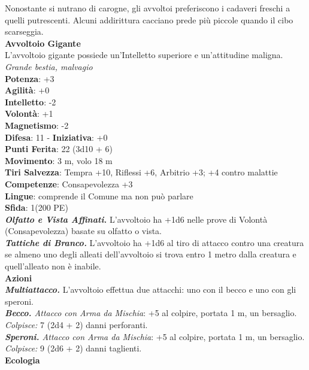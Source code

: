 \begin{multicols}{2}
Nonostante si nutrano di carogne, gli avvoltoi preferiscono i cadaveri freschi a quelli putrescenti. Alcuni addirittura cacciano prede più piccole quando il cibo scarseggia.\\

\medskip\textbf{Avvoltoio Gigante}\\
L'avvoltoio gigante possiede un'Intelletto superiore e un'attitudine maligna.\\
\emph{Grande bestia, malvagio}\\
\textbf{Potenza}: +3\\
\textbf{Agilità}: +0\\
\textbf{Intelletto}: -2\\
\textbf{Volontà}: +1\\
\textbf{Magnetismo}: -2\\
\textbf{Difesa}: 11 - \textbf{Iniziativa}: +0\\
\textbf{Punti Ferita}: 22 (3d10 + 6)\\
\textbf{Movimento}: 3 m, volo 18 m\\
\textbf{Tiri Salvezza}: Tempra +10, Riflessi +6, Arbitrio +3; +4 contro malattie\\
\textbf{Competenze}: Consapevolezza +3\\
\textbf{Lingue}: comprende il Comune ma non può parlare\\
\textbf{Sfida}: 1(200 PE)\smallskip\\
\emph{\textbf{Olfatto e Vista Affinati.}} L'avvoltoio ha +1d6 nelle prove di Volontà (Consapevolezza) basate su olfatto o vista.\\
\emph{\textbf{Tattiche di Branco.}} L'avvoltoio ha +1d6 al tiro di attacco contro una creatura se almeno uno degli alleati dell'avvoltoio si trova entro 1 metro dalla creatura e quell'alleato non è inabile.\\
\smallskip\textbf{Azioni}\\
\emph{\textbf{Multiattacco.}} L'avvoltoio effettua due attacchi: uno con il becco e uno con gli speroni.\\
\emph{\textbf{Becco.} Attacco con Arma da Mischia}: +5 al colpire, portata 1 m, un bersaglio.\\
\emph{Colpisce:} 7 (2d4 + 2) danni perforanti.\\
\emph{\textbf{Speroni.} Attacco con Arma da Mischia}: +5 al colpire, portata 1 m, un bersaglio.\\
\emph{Colpisce:} 9 (2d6 + 2) danni taglienti.\\
\textbf{Ecologia}\\

\end{multicols}
